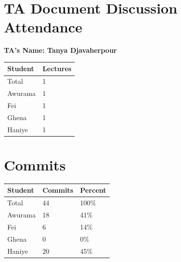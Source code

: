 \documentclass{article}
\begin{document}

\section{TA Document Discussion Attendance}


\noindent \textbf{TA's Name: Tanya Djavaherpour}

\begin{table}[H]
\centering
\begin{tabular}{ll}
\toprule
\textbf{Student} & \textbf{Lectures}\\
\midrule
Total & 1\\
Awurama & 1\\
Fei & 1\\
Ghena & 1\\
Haniye & 1\\
\bottomrule
\end{tabular}
\end{table}


\section{Commits}


\begin{table}[H]
\centering
\begin{tabular}{lll}
\toprule
\textbf{Student} & \textbf{Commits} & \textbf{Percent}\\
\midrule
Total & 44 & 100\% \\
Awurama & 18 & 41\% \\
Fei & 6 & 14\% \\
Ghena & 0 & 0\% \\
Haniye & 20 & 45\% \\
\bottomrule
\end{tabular}
\end{table}
\end{document}
